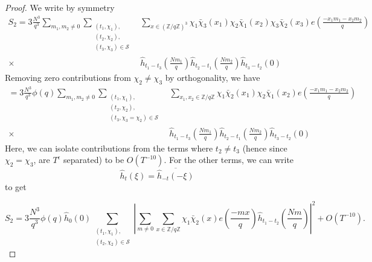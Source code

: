 \begin{proof}
    We write by symmetry \begin{align*}
        S_2= 3\frac{N^3}{q^3}\sum_{m_1,m_2\neq 0}\sum_{\substack{(t_1,\chi_1),\\(t_2,\chi_2),\\(t_3,\chi_3)\in\mathcal{S}}} &\sum_{x\in (\mathbb{Z}/q\mathbb{Z})^3}\chi_1\bar{\chi}_3(x_1)\chi_2\bar{\chi}_1(x_2)\chi_3\bar{\chi}_2(x_3) e\left(\frac{-x_1m_1-x_2m_2}{q}\right)\\
        \times \ &\hat{h}_{t_1-t_3}\left(\frac{Nm_1}{q}\right)\hat{h}_{t_2-t_1}\left(\frac{Nm_2}{q}\right)\hat{h}_{t_3-t_2}\left(0\right)
    \end{align*}
    Removing zero contributions from $\chi_2\neq \chi_3$ by orthogonality,
    we have \begin{align*}
        =3\frac{N^3}{q^3} \phi(q) \sum_{m_1,m_2\neq 0}\sum_{\substack{(t_1,\chi_1),\\(t_2,\chi_2),\\(t_3,\chi_3=\chi_2)\in\mathcal{S}}} &\sum_{x_1,x_2 \in \mathbb{Z}/q\mathbb{Z}}\chi_1\bar{\chi}_2(x_1)\chi_2\bar{\chi}_1(x_2) e\left(\frac{-x_1m_1-x_2m_2}{q}\right)\\
        \times \ &\hat{h}_{t_1-t_3}\left(\frac{Nm_1}{q}\right)\hat{h}_{t_2-t_1}\left(\frac{Nm_2}{q}\right)\hat{h}_{t_3-t_2}\left(0\right)
    \end{align*}
    Here, we can isolate contributions from the terms where $t_2\neq t_3$ (hence since $\chi_2=\chi_3$, are $T^{\epsilon}$ separated) to be $O(T^{-10})$. For the other terms, we can write
    \[
        \hat{h}_t(\xi) = \overline{\hat{h}_{-t}(-\xi)}
    \]
    to get 
    \iffalse
    $S_2$
    \begin{align*}
        = 3\frac{N^3}{q^3} \hat{h}_{0}\left(0\right)\phi(q) \sum_{m_1,m_2\neq 0}\sum_{\substack{(t_1,\chi_1),\\(t_2,\chi_2)\in\mathcal{S}}} &\sum_{x_1,x_2 \in \mathbb{Z}/q\mathbb{Z}}\chi_1\bar{\chi}_2(x_1)\chi_2\bar{\chi}_1(x_2) e\left(\frac{-x_1m_1-x_2m_2}{q}\right)\\
        \times \ &\hat{h}_{t_1-t_2}\left(\frac{Nm_1}{q}\right)\hat{h}_{t_2-t_1}\left(\frac{Nm_2}{q}\right)
    \end{align*}
    and by 
    
    we can rewrite this to get
    \fi
    \[
        S_2 = 3\frac{N^3}{q^3} \phi(q) \hat{h}_{0}\left(0\right) \sum_{\substack{(t_1,\chi_1),\\(t_2,\chi_2)\in\mathcal{S}}} \left|\sum_{m\neq 0} \sum_{x \in \mathbb{Z}/q\mathbb{Z}}\chi_1\bar{\chi}_2(x) e\left(\frac{-mx}{q}\right)
         \hat{h}_{t_1-t_2}\left(\frac{Nm}{q}\right)\right|^2 + O(T^{-10}).
    \]
\end{proof}
